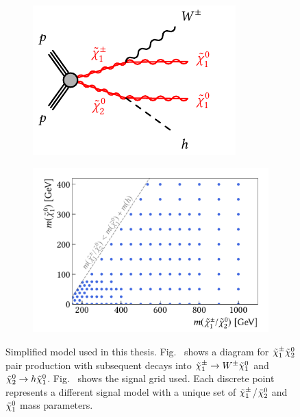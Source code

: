 \begin{figure}
	\centering
	\begin{subfigure}[b]{0.45\linewidth}
		\centering\includegraphics[width=.85\textwidth]{c1n2_wh}		
		\vspace{1em}
		\caption{\label{fig:Wh_model}}
	\end{subfigure}\hfill
	\begin{subfigure}[b]{0.55\linewidth}
		\centering\includegraphics[width=.9\textwidth]{signalgrid}
		\caption{\label{fig:signalgrid}}
	\end{subfigure}	
	\caption{Simplified model used in this thesis. Fig.~ shows a diagram for $\tilde{\chi}_1^\pm\tilde{\chi}_2^0$ pair production with subsequent decays into $\tilde{\chi}_1^\pm\rightarrow W^\pm\tilde{\chi}_1^0$ and $\tilde{\chi}_2^0\rightarrow h\tilde{\chi}_1^0$. Fig.~ shows the signal grid used. Each discrete point represents a different signal model with a unique set of $\tilde{\chi}_1^\pm$/$\tilde{\chi}_2^0$ and $\tilde{\chi}_1^0$ mass parameters.}\label{fig:models_used}
\end{figure}

